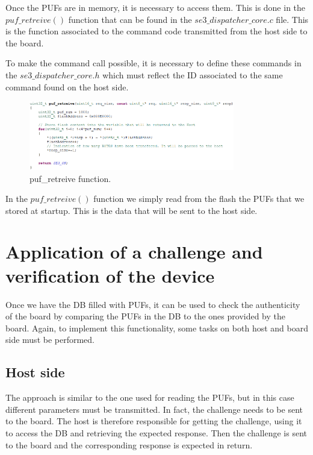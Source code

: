 Once the PUFs are in memory, it is necessary to access them. This is done in the $puf\_retreive()$ function that can be found in the $se3\_dispatcher\_core.c$ file. This is the function associated to the command code transmitted from the host side to the board.

To make the command call possible, it is necessary to define these commands in the $se3\_dispatcher\_core.h$ which must reflect the ID associated to the same command found on the host side.

\begin{figure}[h!]
	\vspace{0.5cm}
	\includegraphics[width = 0.8\textwidth]{images/puf_retreive.png}
	\caption{puf\_retreive function. }
	\label{fig:puf_retreive}
\end{figure}

In the $puf\_retreive()$ function we simply read from the flash the PUFs that we stored at startup. This is the data that will be sent to the host side.


\section {Application of a challenge and verification of the device} 
\label{section:impl_host}

Once we have the DB filled with PUFs, it can be used to check the authenticity of the board by comparing the PUFs in the DB to the ones provided by the board. Again, to implement this functionality, some tasks on both host and board side must be performed.

\subsection{Host side}

The approach is similar to the one used for reading the PUFs, but in this case different parameters must be transmitted. In fact, the challenge needs to be sent to the board. The host is therefore responsible for getting the challenge, using it to access the DB and retrieving the expected response. Then the challenge is sent to the board and the corresponding response is expected in return.

